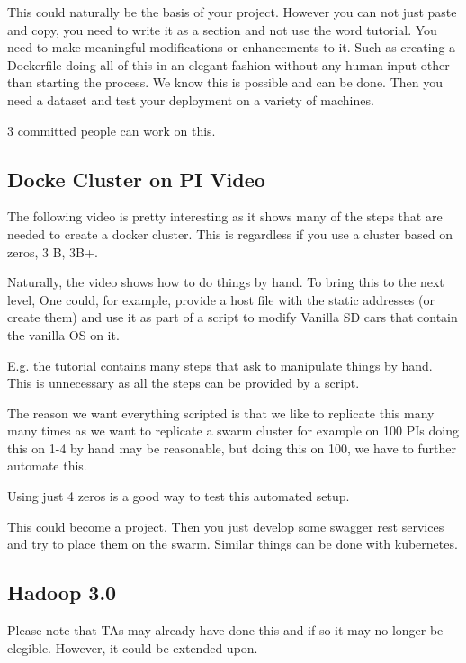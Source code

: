This could naturally be the basis of your project. However you can not
just paste and copy, you need to write it as a section and not use the
word tutorial. You need to make meaningful modifications or
enhancements to it. Such as creating a Dockerfile doing all of this in
an elegant fashion without any human input other than starting the
process. We know this is possible and can be done. Then you need a
dataset and test your deployment on a variety of machines.
 
3 committed people can work on this.


\subsection{Docke Cluster on PI Video}

The following video is pretty interesting as it shows many of the
steps that are needed to create a docker cluster. This is regardless
if you use a cluster based on zeros, 3 B, 3B+.


Naturally, the video shows how to do things by hand. To bring this to
the next level, One could, for example, provide a host file with the
static addresses (or create them) and use it as part of a script to
modify Vanilla SD cars that contain the vanilla OS on it.

E.g. the tutorial contains many steps that ask to manipulate things by
hand. This is unnecessary as all the steps can be provided by a
script. 

The reason we want everything scripted is that we like to replicate
this many many times as we want to replicate a swarm cluster for
example on 100 PIs doing this on 1-4 by hand may be reasonable, but
doing this on 100, we have to further automate this.

Using just 4 zeros is a good way to test this automated setup.  

This could become a project. Then you just develop some swagger rest
services and try to place them on the swarm. Similar things can be
done with kubernetes.

\subsection{Hadoop 3.0}

\begin{IU}
Please note that TAs may already have done this and if so it may no
longer be elegible. However, it could be extended upon.
\end{IU}


